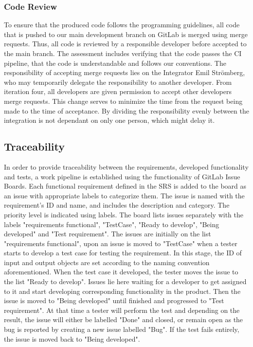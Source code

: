 \documentclass{article}
\begin{document}
	\subsubsection{Code Review}
	To ensure that the produced code follows the programming guidelines, all code that is pushed to our main development branch on GitLab is merged using merge requests. Thus, all code is reviewed by a responsible developer before accepted to the main branch. The assessment includes verifying that the code passes the CI pipeline, that the code is understandable and follows our conventions. The responsibility of accepting merge requests lies on the Integrator Emil Strömberg, who may temporarily delegate the responsibility to another developer. From iteration four, all developers are given permission to accept other developers merge requests. This change serves to minimize the time from the request being made to the time of acceptance. By dividing the responsibility evenly between the integration is not dependant on only one person, which might delay it.
	
	\subsection{Traceability} \label{traceability}
	In order to provide traceability between the requirements, developed functionality and tests, a work pipeline is established using the functionality of GitLab Issue Boards. Each functional requirement defined in the SRS is added to the board as an issue with appropriate labels to categorize them. The issue is named with the requirement's ID and name, and includes the description and category. The priority level is indicated using labels. The board lists issues separately with the labels "requirements functional", "TestCase", "Ready to develop", "Being developed" and "Test requirement". The issues are initially on the list "requirements functional", upon an issue is moved to "TestCase" when a tester starts to develop a test case for testing the requirement. In this stage, the ID of input and output objects are set according to the naming convention aforementioned. When the test case it developed, the tester moves the issue to the list "Ready to develop". Issues lie here waiting for a developer to get assigned to it and start developing corresponding functionality in the product. Then the issue is moved to "Being developed" until finished and progressed to "Test requirement". At that time a tester will perform the test and depending on the result, the issue will either be labelled "Done" and closed, or remain open as the bug is reported by creating a new issue labelled "Bug". If the test fails entirely, the issue is moved back to "Being developed".
	
\end{document}
